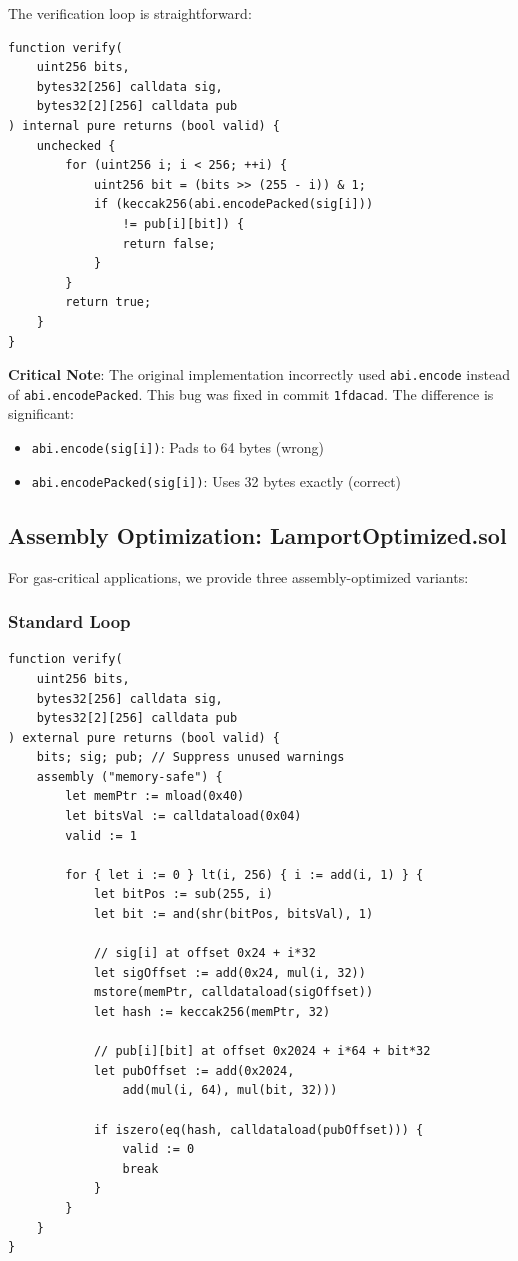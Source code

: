 \documentclass[11pt,a4paper]{article}
\begin{document}
The verification loop is straightforward:

\begin{lstlisting}[language=Solidity]
function verify(
    uint256 bits,
    bytes32[256] calldata sig,
    bytes32[2][256] calldata pub
) internal pure returns (bool valid) {
    unchecked {
        for (uint256 i; i < 256; ++i) {
            uint256 bit = (bits >> (255 - i)) & 1;
            if (keccak256(abi.encodePacked(sig[i]))
                != pub[i][bit]) {
                return false;
            }
        }
        return true;
    }
}
\end{lstlisting}

\textbf{Critical Note}: The original implementation incorrectly used \texttt{abi.encode} instead of \texttt{abi.encodePacked}. This bug was fixed in commit \texttt{1fdacad}. The difference is significant:
\begin{itemize}
    \item \texttt{abi.encode(sig[i])}: Pads to 64 bytes (wrong)
    \item \texttt{abi.encodePacked(sig[i])}: Uses 32 bytes exactly (correct)
\end{itemize}

\subsection{Assembly Optimization: LamportOptimized.sol}

For gas-critical applications, we provide three assembly-optimized variants:

\subsubsection{Standard Loop}

\begin{lstlisting}[language=Solidity]
function verify(
    uint256 bits,
    bytes32[256] calldata sig,
    bytes32[2][256] calldata pub
) external pure returns (bool valid) {
    bits; sig; pub; // Suppress unused warnings
    assembly ("memory-safe") {
        let memPtr := mload(0x40)
        let bitsVal := calldataload(0x04)
        valid := 1

        for { let i := 0 } lt(i, 256) { i := add(i, 1) } {
            let bitPos := sub(255, i)
            let bit := and(shr(bitPos, bitsVal), 1)

            // sig[i] at offset 0x24 + i*32
            let sigOffset := add(0x24, mul(i, 32))
            mstore(memPtr, calldataload(sigOffset))
            let hash := keccak256(memPtr, 32)

            // pub[i][bit] at offset 0x2024 + i*64 + bit*32
            let pubOffset := add(0x2024,
                add(mul(i, 64), mul(bit, 32)))

            if iszero(eq(hash, calldataload(pubOffset))) {
                valid := 0
                break
            }
        }
    }
}
\end{lstlisting}
\end{document}
